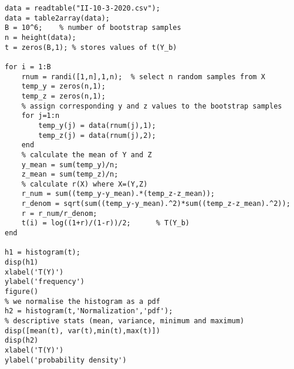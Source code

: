 \lstset{basicstyle=\footnotesize,style=myCustomMatlabStyle}
\begin{lstlisting}
data = readtable("II-10-3-2020.csv");
data = table2array(data);
B = 10^6;    % number of bootstrap samples
n = height(data);
t = zeros(B,1); % stores values of t(Y_b)

for i = 1:B
    rnum = randi([1,n],1,n);  % select n random samples from X
    temp_y = zeros(n,1);  
    temp_z = zeros(n,1);
    % assign corresponding y and z values to the bootstrap samples
    for j=1:n
        temp_y(j) = data(rnum(j),1);
        temp_z(j) = data(rnum(j),2);
    end
    % calculate the mean of Y and Z
    y_mean = sum(temp_y)/n;
    z_mean = sum(temp_z)/n;
    % calculate r(X) where X=(Y,Z)
    r_num = sum((temp_y-y_mean).*(temp_z-z_mean));
    r_denom = sqrt(sum((temp_y-y_mean).^2)*sum((temp_z-z_mean).^2));
    r = r_num/r_denom;
    t(i) = log((1+r)/(1-r))/2;      % T(Y_b)
end

h1 = histogram(t);
disp(h1)
xlabel('T(Y)')
ylabel('frequency')
figure()
% we normalise the histogram as a pdf
h2 = histogram(t,'Normalization','pdf');
% descriptive stats (mean, variance, minimum and maximum)
disp([mean(t), var(t),min(t),max(t)])
disp(h2)
xlabel('T(Y)')
ylabel('probability density')

\end{lstlisting}